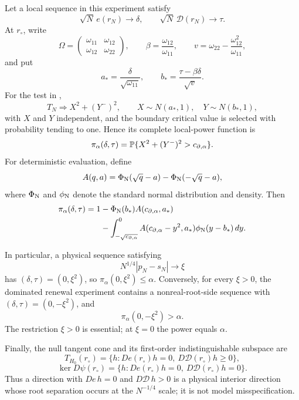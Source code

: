 \begin{proposition}
Let a local sequence in this experiment satisfy
\[
\sqrt N\,e(r_N)\longrightarrow\delta,\qquad
\sqrt N\,\mathcal D(r_N)\longrightarrow\tau.
\]
At \(r_\circ\), write
\[
\Omega=
\begin{pmatrix}\omega_{11}&\omega_{12}\\
\omega_{12}&\omega_{22}\end{pmatrix},
\qquad
\beta=\frac{\omega_{12}}{\omega_{11}},
\qquad
v=\omega_{22}-\frac{\omega_{12}^2}{\omega_{11}},
\]
and put
\[
a_*=\frac{\delta}{\sqrt{\omega_{11}}},
\qquad
b_*=\frac{\tau-\beta\delta}{\sqrt v}.
\]
For the test in
,
\[
T_N\Rightarrow X^2+(Y^-)^2,
\qquad
X\sim N(a_*,1),\quad Y\sim N(b_*,1),
\]
with \(X\) and \(Y\) independent, and the boundary critical value is
selected with probability tending to one.  Hence its complete local-power
function is
\[
\pi_\alpha(\delta,\tau)
=\mathbb{P}\{X^2+(Y^-)^2>c_{\partial,\alpha}\}.
\]
For deterministic evaluation, define
\[
A(q,a)=\Phi_{\rm N}(\sqrt q-a)-\Phi_{\rm N}(-\sqrt q-a),
\]
where \(\Phi_{\rm N}\) and \(\phi_{\rm N}\) denote the standard normal
distribution and density.  Then
\[
\begin{aligned}
\pi_\alpha(\delta,\tau)
=1&-\Phi_{\rm N}(b_*)A(c_{\partial,\alpha},a_*)\\
&-\int_{-\sqrt{c_{\partial,\alpha}}}^{0}
A(c_{\partial,\alpha}-y^2,a_*)\phi_{\rm N}(y-b_*)\,dy .
\end{aligned}
\]

In particular, a physical sequence satisfying
\[
N^{1/4}|p_N-s_N|\longrightarrow\xi
\]
has \((\delta,\tau)=(0,\xi^2)\), so
\(\pi_\alpha(0,\xi^2)\le\alpha\).  Conversely, for every \(\xi>0\), the
dominated renewal experiment contains a nonreal-root-side sequence with
\((\delta,\tau)=(0,-\xi^2)\), and
\[
\pi_\alpha(0,-\xi^2)>\alpha.
\]
The restriction \(\xi>0\) is essential; at \(\xi=0\) the power equals
\(\alpha\).

Finally, the null tangent cone and its first-order indistinguishable
subspace are
\[
T_{H_0}(r_\circ)
=\{h:De(r_\circ)h=0,\ D\mathcal D(r_\circ)h\ge0\},
\]
\[
\ker D\psi(r_\circ)
=\{h:De(r_\circ)h=0,\ D\mathcal D(r_\circ)h=0\}.
\]
Thus a direction with \(De\,h=0\) and \(D\mathcal D\,h>0\) is a physical
interior direction whose root separation occurs at the
\(N^{-1/4}\) scale; it is not model misspecification.
\end{proposition}

